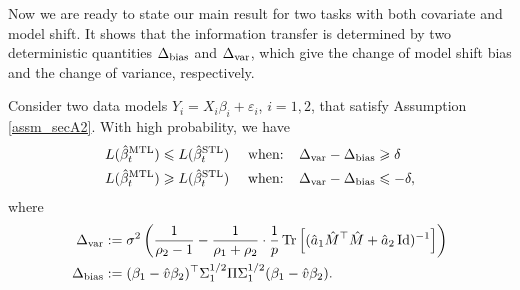 
Now we are ready to state our main result for two tasks with both covariate and model shift. It shows that the information transfer is determined by two deterministic quantities $\Delta_{\text{bias}}$ and $\Delta_{\text{var}}$, which give the change of model shift bias and the change of variance, respectively.



\begin{theorem}\label{thm_model_shift}
Consider two data models $Y_i = X_i\beta_i + \varepsilon_i$, $i=1,2$, that satisfy Assumption \ref{assm_secA2}. With high probability, we have
	\begin{align}
	 	L(\hat{\beta}_{t}^{\text{MTL}}) \leqslant L(\hat{\beta}_t^{\text{STL}}) \quad \text{ when: } \ \ &\Delta_{\text{var}} - \Delta_{\text{bias}} \geqslant   \delta \label{upper}\\
		L(\hat{\beta}_t^{\text{MTL}}) \geqslant L(\hat{\beta}_t^{\text{STL}}) \quad \text{ when: } \ \ &\Delta_{\text{var}} - \Delta_{\text{bias}} \leqslant - \delta, \label{lower}
	\end{align}
	where
	\begin{align} %
		\Delta_{\vari} &\define {\sigma^2}\bigbrace{\frac{1}{\rho_2 - 1} -  \frac{1}{\rho_1 + \rho_2}\cdot \frac1p \bigtr{(\hat a_1 \hat M^{\top}\hat M + \hat a_2\id)^{-1}} } \label{Deltavarv} \\
		\Delta_{\bias} &\define (\beta_1 - \hat{v}\beta_2)^{\top} \Sigma_1^{1/2} \Pi \Sigma_1^{1/2} (\beta_1 - \hat{v}\beta_2). \label{Deltabetav}
	\end{align}
\end{theorem}

